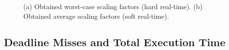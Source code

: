 \documentclass[10pt, conference, compsocconf]{IEEEtran}
\begin{document}
\begin{figure}[htb]
\centering
{}
\caption{(a) Obtained worst-case scaling factors (hard real-time). (b) Obtained average scaling factors (soft real-time).}
\label{fig:scaling_factor}
\end{figure}

\subsection{Deadline Misses and Total Execution Time}
\end{document}
